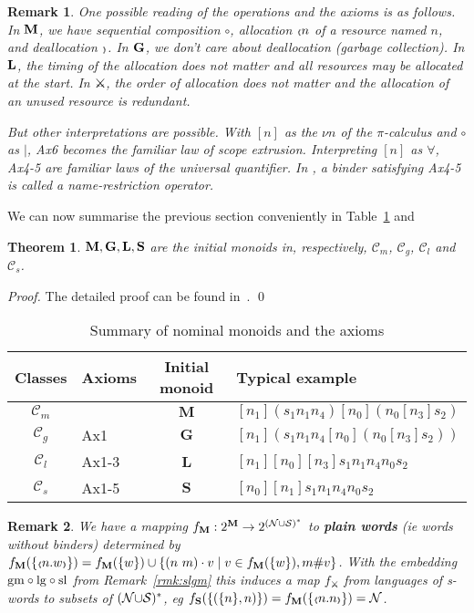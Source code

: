 \documentclass[runningheads,a4paper]{llncs}
\newcommand{\oscope}{\mbox{\tiny$\langle\!\!\langle$}}
\newcommand{\cscope}{\mbox{\tiny$\rangle\!\!\rangle$}}
\newcommand{\names}{\mbox{$\mathcal{N}$}}
\newtheorem{theorem}{Theorem}[section]
\newtheorem{remark}{Theorem}[section]
\newtheorem{theorem}{Theorem}[section]
\newtheorem{remark}{Remark}[section]
\begin{document}
\begin{remark}\label{rmk:axioms}
  One possible reading of the operations and the axioms is as
  follows. In $\mathbf{M}$, we have sequential composition $\circ$,
  allocation $\oscope n$ of a resource named $n$, and deallocation
  $\cscope$. In $\mathbf{G}$, we don't care about deallocation (garbage
  collection). In $\mathbf{L}$, the timing of the allocation does not
  matter and all resources may be allocated at the start. In
  $\swords$, the order of allocation does not matter and the
  allocation of an unused resource is redundant.

  But other interpretations are possible. With $[n]$ as the $\nu n$ of
  the $\pi$-calculus and $\circ$ as $\mid$, Ax6 becomes the familiar
  law of scope extrusion. Interpreting $[n]$ as $\forall$, Ax4-5 are
  familiar laws of the universal quantifier. In \cite{pitts:popl10}, a
  binder satisfying Ax4-5 is called a name-restriction operator.
\end{remark}
We can now summarise the previous section conveniently in
Table~\ref{tb:axioms} and
\begin{theorem}\label{thm:monoids}
  $\mathbf{M},\mathbf{G},\mathbf{L},\mathbf{S}$ are the initial monoids in,
  respectively, $\mathcal{C}_m$, $\mathcal{C}_{g}$, $\mathcal{C}_l$
  and $\mathcal{C}_s$.
\end{theorem}
\begin{proof}
  The detailed proof can be found in~\cite{kst10}.
\qed
\end{proof}
\begin{table}[t]
\begin{center}
 \caption{Summary of nominal monoids and the axioms}
 \label{tb:axioms}
\begin{tabular}{|c|p{4cm}|c|p{3.6cm}|}
  \hline
  Classes & Axioms & Initial monoid & Typical example \\
  \hline 
  $\mathcal{C}_m$ & & $\mathbf{M}$ & $[n_1](s_1n_1n_4)[n_0](n_0[n_3]s_2)$  \\
  \hline
  $\mathcal{C}_{g}$ & Ax1 &  
  $\mathbf{G}$ & $[n_1](s_1n_1n_4[n_0](n_0[n_3]s_2))$ \\
  \hline
  $\mathcal{C}_{l}$& Ax1-3 
                   & $\mathbf{L}$ 
                   & $[n_1][n_0][n_3]s_1n_1n_4n_0s_2$  \\
  \hline
  $\mathcal{C}_{s}$& Ax1-5
                   & $\mathbf{S}$ 
                   & $[n_0][n_1]s_1n_1n_4n_0s_2$\\
  \hline
\end{tabular}
\end{center}
\end{table}
\begin{remark}\label{rmk:plain-words}
  We have a mapping $f_{\mathbf{M}}:2^{\mathbf{M}}\to
  2^{(\mathcal{N}{\cup}\mathcal{S})^\ast}$ to
  \textbf{plain words} (ie words without binders) determined by
$\mpwtr(\{\oscope n.w\cscope\}) = \mpwtr(\{w\}) \cup \{(n\ m) \cdot v \mid v\in \mpwtr(\{w\}), m\# v\}$.
With the embedding $\mathrm{gm}\circ\mathrm{lg}\circ\mathrm{sl}$ from
Remark~\ref{rmk:slgm} this induces a map $f_{\swords}$ from languages
of s-words to subsets of $(\mathcal{N}{\cup}\mathcal{S})^\ast$, eg
$f_{\swords}(\{(\{n\},n)\})=f_\mwords(\{\oscope n.n\cscope\})=\names$.
\end{remark}
\end{document}
